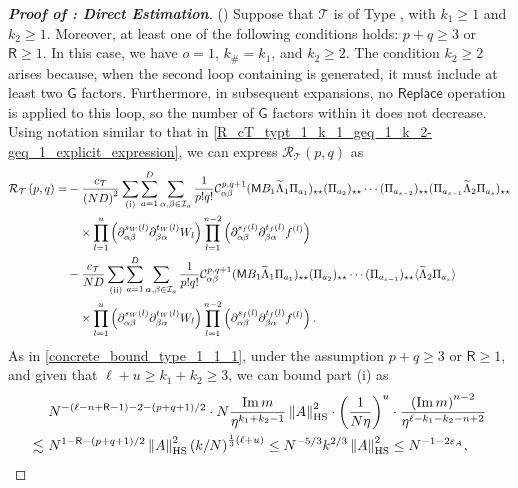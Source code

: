 \documentclass[10pt,reqno]{amsart}
\numberwithin{equation}{section}
\numberwithin{figure}{section}
\newcommand{\rmnum}[1]{\uppercase\expandafter{\romannumeral #1}}
\theoremstyle{plain} %
\theoremstyle{definition} %
\newcommand{\wt}{\widetilde}
\renewcommand{\txt}[1]{\text{\rm{#1}}}
\newcommand{\cT}{\mathcal T}
\newcommand{\cI}{\mathcal{I}}
\newcommand{\cC}{\mathcal{C}}
\newcommand{\cR}{{\mathcal R}}
\newcommand{\sG}{\mathsf G}
\newcommand{\sM}{\mathsf M}
\newcommand{\sR}{\mathsf R}
\renewcommand{\leq}{\le}
\renewcommand{\geq}{\ge}
\newcommand{\p}[1]{({#1})}
\newcommand{\pa}[1]{\left({#1}\right)}
\newcommand{\norma}[1]{\left\lVert #1 \right\rVert}
\newcommand{\avg}[1]{\langle #1 \rangle}
\DeclareMathOperator{\im}{\mathrm{Im}}
\newcommand{\tLambda}{{\wt{\Lambda}}}
\newcommand{\sreplace}{\mathsf{Replace}}
\newcommand{\HS}{\txt{HS}}
\newcommand{\iab}{\alpha\beta}
\newcommand{\iba}{\beta\alpha}
\newcommand{\tl}{\tLambda}
\newcommand{\mm}{\ell}
\numberwithin{equation}{section}
\begin{document}
\begin{proof}[\bf Proof of : Direct Estimation]
         \noindent(\rmnum{3}) Suppose that $\cT$ is of Type \rmnum{2}, with $k_1\geq 1$ and $k_2\geq 1$. Moreover, at least one of the following conditions holds: $p+q\geq 3$ or $\sR\geq 1$. In this case, we have $o=1$, $k_{\#}=k_1$, and $k_2\geq 2$. The condition \(k_2 \geq 2\) arises because, when the second loop containing \smash{$\tl_2$} is generated, it must include at least two \(\sG\) factors. Furthermore, in subsequent expansions, no $\sreplace$ operation is applied to this loop, so the number of \(\sG\) factors within it does not decrease.  Using notation similar to that in \eqref{R_cT_typt_1_k_1_geq_1_k_2-geq_1_explicit_expression}, we can express $\cR_{\cT}\pa{p,q}$ as 
         \begin{align*}
                 \cR_{\cT}\pa{p,q}=& -\frac{c_{\cT}}{\pa{ND}^2}\sum_{\pa{\txt{i}}}\sum_{a=1}^D\sum_{\alpha,\beta\in \cI_a}\frac{1}{p!q!}\cC_{\iab}^{p,q+1}\p{\sM B_1 \tl_1\Pi_{a_1}}_{\star\star}\p{\Pi_{a_2}}_{\star\star}\cdots\p{\Pi_{a_{s-2}}}_{\star\star}\p{\Pi_{a_{s-1}}\tl_2\Pi_{a_s}}_{\star\star}\\
                &\quad\times\prod_{l=1}^{u}\pa{\partial_{\iab}^{s_W\pa{l}}\partial_{\iba}^{t_W\pa{l}}W_l}\prod_{l=1}^{n-2}\pa{\partial_{\iab}^{s_f\pa{l}}\partial_{\iba}^{t_f\pa{l}}f^{\pa{l}}}\\
                &-\frac{c_{\cT}}{ND}\sum_{\pa{\txt{ii}}}\sum_{a=1}^D\sum_{\alpha,\beta\in \cI_a}\frac{1}{p!q!}\cC_{\iab}^{p,q+1}\p{\sM B_1 \tl_1\Pi_{a_1}}_{\star\star}\p{\Pi_{a_2}}_{\star\star}\cdots\p{\Pi_{a_{s-1}}}_{\star\star}\avg{\tl_2\Pi_{a_s}}\\
                & \quad\times\prod_{l=1}^{u}\pa{\partial_{\iab}^{s_W\pa{l}}\partial_{\iba}^{t_W\pa{l}}W_l}\prod_{l=1}^{n-2}\pa{\partial_{\iab}^{s_f\pa{l}}\partial_{\iba}^{t_f\pa{l}}f^{\pa{l}}}.
             \end{align*}
         As in \eqref{concrete_bound_type_1_1_1}, under the assumption $p+q\geq 3$ or $\sR\geq 1$, and given that $\mm+u\geq k_1+k_2\geq 3$, we can bound part (i) as
         \begin{equation}\label{concrete_bound_type_2_1_1}
             \begin{aligned}
                 &~N^{-\pa{\mm-n+\sR-1} -2 -\pa{p+q+1}/2}\cdot N\frac{\im m}{\eta^{k_1+k_2-1}}\norma{A}_{\HS}^2\cdot \pa{\frac{1}{N\eta}}^{u}\cdot \frac{\pa{\im m}^{n-2}}{\eta^{\mm-k_1-k_2-n+2}}\\
                 \lesssim  &~ N^{1-\sR-\pa{p+q+1}/2}\norma{A}_{\HS}^2\pa{k/N}^{\frac 1 3(\mm+u)}\leq N^{-5/3}k^{2/3}\norma{A}_{\HS}^2\leq N^{-1-2\varepsilon_A},

\end{aligned}
\end{equation}
\end{proof}
\end{document}
